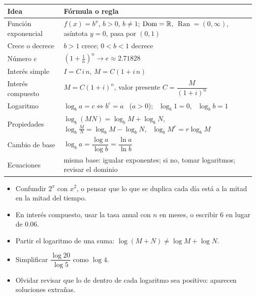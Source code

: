 \documentclass[11pt,a4paper]{article}
\newcommand{\Dom}{\operatorname{Dom}}
\newcommand{\Ran}{\operatorname{Ran}}
\begin{document}
\clearpage
\repaso
\begin{center}\renewcommand{\arraystretch}{1.45}
\begin{tabularx}{\linewidth}{@{}l L@{}}
\toprule
Idea & Fórmula o regla\\ \midrule
Función exponencial & $f(x)=b^{x}$, $b>0$, $b\neq1$; $\Dom=\R$, $\Ran=(0,\infty)$, asíntota $y=0$, pasa por $(0,1)$\\
Crece o decrece & $b>1$ crece; $0<b<1$ decrece\\
Número $e$ & $\left(1+\frac1n\right)^{n}\to e\approx2.71828$\\
Interés simple & $I=C\,i\,n$, \quad $M=C(1+i\,n)$\\
Interés compuesto & $M=C(1+i)^{n}$, \quad valor presente $C=\dfrac{M}{(1+i)^{n}}$\\
Logaritmo & $\log_b a=c\iff b^{c}=a$ \ ($a>0$); \ $\log_b1=0$, \ $\log_b b=1$\\
Propiedades & $\log_b(MN)=\log_bM+\log_bN$, \ $\log_b\frac MN=\log_bM-\log_bN$, \ $\log_bM^{r}=r\log_bM$\\
Cambio de base & $\log_b a=\dfrac{\log a}{\log b}=\dfrac{\ln a}{\ln b}$\\
Ecuaciones & misma base: igualar exponentes; si no, tomar logaritmos; revisar el dominio\\
\bottomrule
\end{tabularx}
\end{center}

\begin{ojo}
\begin{itemize}
\item Confundir $2^{x}$ con $x^{2}$, o pensar que lo que se duplica cada día está a la mitad en la mitad del tiempo.
\item En interés compuesto, usar la tasa anual con $n$ en meses, o escribir $6$ en lugar de $0.06$.
\item Partir el logaritmo de una suma: $\log(M+N)\neq\log M+\log N$.
\item Simplificar $\dfrac{\log 20}{\log 5}$ como $\log 4$.
\item Olvidar revisar que lo de dentro de cada logaritmo sea positivo: aparecen soluciones extrañas.
\end{itemize}
\end{ojo}
\end{document}
